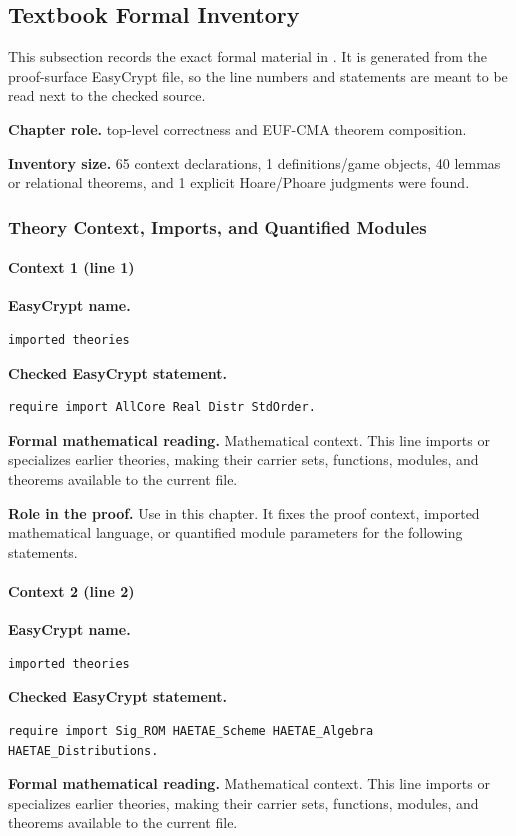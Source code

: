 \subsection*{Textbook Formal Inventory}
This subsection records the exact formal material in .  It is generated from the proof-surface EasyCrypt file, so the line numbers and statements are meant to be read next to the checked source.

\noindent\textbf{Chapter role.} top-level correctness and EUF-CMA theorem composition.

\noindent\textbf{Inventory size.} 65 context declarations, 1 definitions/game objects, 40 lemmas or relational theorems, and 1 explicit Hoare/Phoare judgments were found.

\subsubsection*{Theory Context, Imports, and Quantified Modules}
\paragraph{Context 1 (line 1)}
\noindent\textbf{EasyCrypt name.}
\begin{lstlisting}[language=EasyCrypt,basicstyle=\ttfamily\scriptsize]
imported theories
\end{lstlisting}
\noindent\textbf{Checked EasyCrypt statement.}
\begin{lstlisting}[language=EasyCrypt,basicstyle=\ttfamily\scriptsize]
require import AllCore Real Distr StdOrder.
\end{lstlisting}
\noindent\textbf{Formal mathematical reading.}
Mathematical context. This line imports or specializes earlier theories, making their carrier sets, functions, modules, and theorems available to the current file.

\noindent\textbf{Role in the proof.}
Use in this chapter. It fixes the proof context, imported mathematical language, or quantified module parameters for the following statements.

\paragraph{Context 2 (line 2)}
\noindent\textbf{EasyCrypt name.}
\begin{lstlisting}[language=EasyCrypt,basicstyle=\ttfamily\scriptsize]
imported theories
\end{lstlisting}
\noindent\textbf{Checked EasyCrypt statement.}
\begin{lstlisting}[language=EasyCrypt,basicstyle=\ttfamily\scriptsize]
require import Sig_ROM HAETAE_Scheme HAETAE_Algebra HAETAE_Distributions.
\end{lstlisting}
\noindent\textbf{Formal mathematical reading.}
Mathematical context. This line imports or specializes earlier theories, making their carrier sets, functions, modules, and theorems available to the current file.

